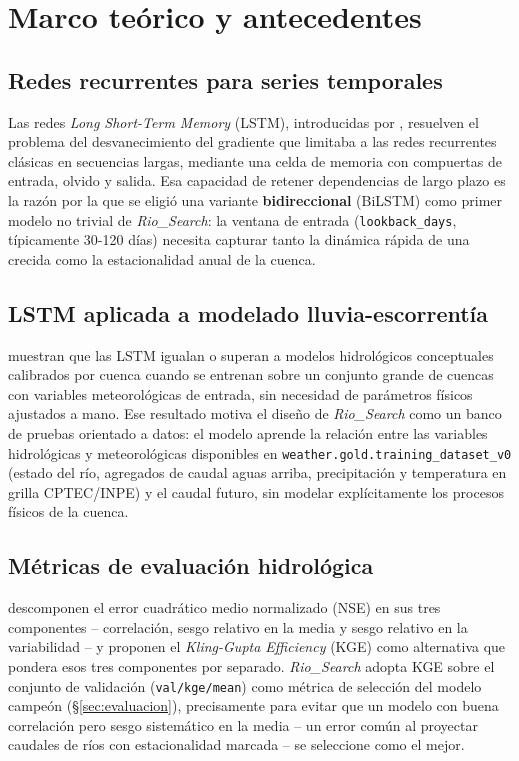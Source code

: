 \chapter{Marco te\'orico y antecedentes}
\label{chap:marco-teorico}

\section{Redes recurrentes para series temporales}

Las redes \emph{Long Short-Term Memory} (LSTM), introducidas por
\citep{hochreiter-1997-lstm}, resuelven el problema del desvanecimiento del gradiente que
limitaba a las redes recurrentes cl\'asicas en secuencias largas, mediante una celda de memoria
con compuertas de entrada, olvido y salida. Esa capacidad de retener dependencias de largo plazo
es la raz\'on por la que se eligi\'o una variante \textbf{bidireccional} (BiLSTM) como primer
modelo no trivial de \emph{Rio\_Search}: la ventana de entrada (\texttt{lookback\_days}, t\'ipicamente
30-120 d\'ias) necesita capturar tanto la din\'amica r\'apida de una crecida como la estacionalidad
anual de la cuenca.

\section{LSTM aplicada a modelado lluvia-escorrent\'ia}

\citep{kratzert-2018-lstm-rainfall-runoff} muestran que las LSTM igualan o superan a modelos
hidrol\'ogicos conceptuales calibrados por cuenca cuando se entrenan sobre un conjunto grande de
cuencas con variables meteorol\'ogicas de entrada, sin necesidad de par\'ametros f\'isicos
ajustados a mano. Ese resultado motiva el dise\~no de \emph{Rio\_Search} como un banco de pruebas
orientado a datos: el modelo aprende la relaci\'on entre las variables hidrol\'ogicas y
meteorol\'ogicas disponibles en \texttt{weather.gold.training\_dataset\_v0} (estado del r\'io,
agregados de caudal aguas arriba, precipitaci\'on y temperatura en grilla CPTEC/INPE) y el caudal
futuro, sin modelar expl\'icitamente los procesos f\'isicos de la cuenca.

\section{M\'etricas de evaluaci\'on hidrol\'ogica}

\citep{gupta-2009-kge} descomponen el error cuadr\'atico medio normalizado (NSE) en sus tres
componentes -- correlaci\'on, sesgo relativo en la media y sesgo relativo en la variabilidad -- y
proponen el \emph{Kling-Gupta Efficiency} (KGE) como alternativa que pondera esos tres componentes
por separado. \emph{Rio\_Search} adopta KGE sobre el conjunto de validaci\'on
(\texttt{val/kge/mean}) como m\'etrica de selecci\'on del modelo campe\'on (\S\ref{sec:evaluacion}),
precisamente para evitar que un modelo con buena correlaci\'on pero sesgo sistem\'atico en la
media -- un error com\'un al proyectar caudales de r\'ios con estacionalidad marcada -- se
seleccione como el mejor.

